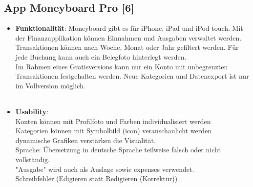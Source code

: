 \documentclass[runningheads,a4paper]{llncs}
\begin{document}
\subsection{App Moneyboard Pro [6]}
\begin{itemize} 
\item \textbf{Funktionalität}: Moneyboard gibt es für iPhone, iPad und iPod touch. Mit der Finanzapplikation können Einnahmen und Ausgaben verwaltet werden. Transaktionen können nach Woche, Monat oder Jahr gefiltert werden.  Für jede Buchung kann auch ein Belegfoto hinterlegt werden. \\

Im Rahmen eines Gratisversions  kann nur ein Konto mit unbegrenzten Transaktionen festgehalten werden.  Neue Kategorien und Datenexport ist nur im Vollversion möglich.\\\\

\item \textbf{Usability}:\\

\textcolor{green}{}	Konten können mit Profilfoto und Farben individualisiert werden\\
\textcolor{green}{}	Kategorien können mit Symbolbild (icon) veranschaulicht werden\\
\textcolor{green}{}	dynamische Grafiken verstärken die Visualität.\\
\textcolor{red}{}	Sprache: Übersetzung in deutsche Sprache teilweise falsch oder nicht vollständig.\\
\textcolor{red}{}	"Ausgabe" wird auch als Auslage sowie expenses verwendet. \\
\textcolor{red}{}	Schreibfehler (Edigieren statt Redigieren (Korrektur))\\
\end{itemize}


\begin{figure}
\centering
{}
\end{figure}
\end{document}
